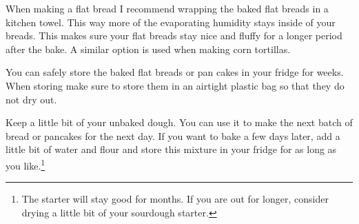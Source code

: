 When making a flat bread I recommend wrapping the baked flat breads
in a kitchen towel. This way more of the evaporating humidity
stays inside of your breads. This makes sure your flat breads stay
nice and fluffy for a longer period after the bake. A similar option is
used when making corn tortillas.

You can safely store the baked flat breads or pan cakes in your fridge
for weeks. When storing make sure to store them in an airtight plastic bag so that
they do not dry out.

Keep a little bit of your unbaked dough. You can use it to make the next
batch of bread or pancakes for the next day. If you want to bake a few days later, add
a little bit of water and flour and store this mixture in your fridge
for as long as you like.\footnote{The starter will stay good for months. If you are out
for longer, consider drying a little bit of your sourdough starter.}
